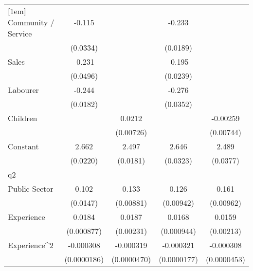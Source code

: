 {\begin{tabular}{l*{4}{c}}
[1em]
Community / Service &      -0.115\sym{***}&                     &      -0.233\sym{***}&                     \\
                    &    (0.0334)         &                     &    (0.0189)         &                     \\
[1em]
Sales               &      -0.231\sym{***}&                     &      -0.195\sym{***}&                     \\
                    &    (0.0496)         &                     &    (0.0239)         &                     \\
[1em]
Labourer            &      -0.244\sym{***}&                     &      -0.276\sym{***}&                     \\
                    &    (0.0182)         &                     &    (0.0352)         &                     \\
[1em]
Children            &                     &      0.0212\sym{**} &                     &    -0.00259         \\
                    &                     &   (0.00726)         &                     &   (0.00744)         \\
[1em]
Constant            &       2.662\sym{***}&       2.497\sym{***}&       2.646\sym{***}&       2.489\sym{***}\\
                    &    (0.0220)         &    (0.0181)         &    (0.0323)         &    (0.0377)         \\
\hline
q2                  &                     &                     &                     &                     \\
Public Sector       &       0.102\sym{***}&       0.133\sym{***}&       0.126\sym{***}&       0.161\sym{***}\\
                    &    (0.0147)         &   (0.00881)         &   (0.00942)         &   (0.00962)         \\
[1em]
Experience          &      0.0184\sym{***}&      0.0187\sym{***}&      0.0168\sym{***}&      0.0159\sym{***}\\
                    &  (0.000877)         &   (0.00231)         &  (0.000944)         &   (0.00213)         \\
[1em]
Experience^{2}      &   -0.000308\sym{***}&   -0.000319\sym{***}&   -0.000321\sym{***}&   -0.000308\sym{***}\\
                    & (0.0000186)         & (0.0000470)         & (0.0000177)         & (0.0000453)         \\

\end{tabular}}
